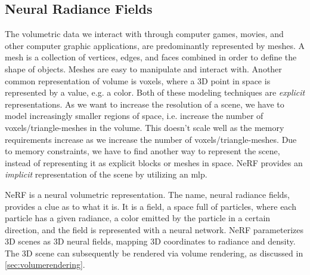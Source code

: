 



\subsection{Neural Radiance Fields}
The volumetric data we interact with through computer games, movies, and other computer graphic applications, are predominantly represented by meshes. A mesh is a collection of vertices, edges, and faces combined in order to define the shape of objects. Meshes are easy to manipulate and interact with. Another common representation of volume is voxels, where a 3D point in space is represented by a value, e.g. a color. Both of these modeling techniques are \textit{explicit} representations. As we want to increase the resolution of a scene, we have to model increasingly smaller regions of space, i.e. increase the number of voxels/triangle-meshes in the volume. This doesn't scale well as the memory requirements increase as we increase the number of voxels/triangle-meshes. Due to memory constraints, we have to find another way to represent the scene, instead of representing it as explicit blocks or meshes in space. NeRF provides an \textit{implicit} representation of the scene by utilizing an \acrshort{mlp}.

NeRF is a neural volumetric representation. The name, neural radiance fields, provides a clue as to what it is. It is a field, a space full of particles, where each particle has a given radiance, a color emitted by the particle in a certain direction, and the field is represented with a neural network. NeRF parameterizes 3D scenes as 3D neural fields, mapping 3D coordinates to radiance and density. The 3D scene can subsequently be rendered via volume rendering, as discussed in \autoref{sec:volumerendering}.


